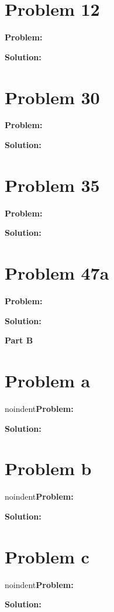 \documentclass{article}
\begin{document}
\section*{Problem 12}
\noindent\textbf{Problem:} 
\bigskip

\noindent\textbf{Solution:} 
\bigskip

\section*{Problem 30}
\noindent\textbf{Problem:} 
\bigskip

\noindent\textbf{Solution:} 
\bigskip

\section*{Problem 35}
\noindent\textbf{Problem:} 
\bigskip

\noindent\textbf{Solution:} 
\bigskip

\section*{Problem 47a}
\noindent\textbf{Problem:} 
\bigskip

\noindent\textbf{Solution:} 

\begin{center}
    \Large\textbf{Part B}
\end{center}

\section*{Problem a}
noindent\textbf{Problem:} 
\bigskip

\noindent\textbf{Solution:}
\bigskip

\section*{Problem b}
noindent\textbf{Problem:} 
\bigskip

\noindent\textbf{Solution:}
\bigskip

\section*{Problem c}
noindent\textbf{Problem:} 
\bigskip

\noindent\textbf{Solution:} 
\end{document}
